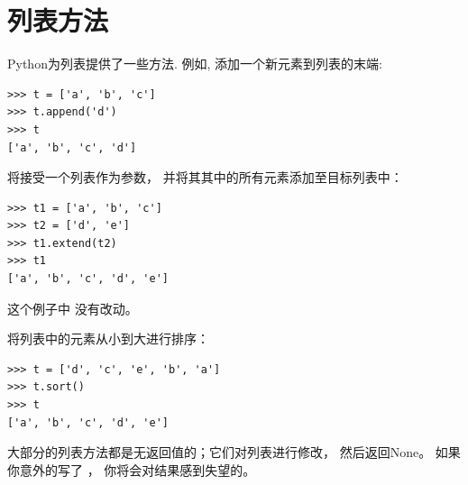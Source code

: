 \section{列表方法}


Python为列表提供了一些方法. 例如,  添加一个新元素到列表的末端:

  

\begin{lstlisting}
>>> t = ['a', 'b', 'c']
>>> t.append('d')
>>> t
['a', 'b', 'c', 'd']
\end{lstlisting}
%

 将接受一个列表作为参数， 并将其其中的所有元素添加至目标列表中：
  

\begin{lstlisting}
>>> t1 = ['a', 'b', 'c']
>>> t2 = ['d', 'e']
>>> t1.extend(t2)
>>> t1
['a', 'b', 'c', 'd', 'e']
\end{lstlisting}

%

这个例子中  没有改动。


 将列表中的元素从小到大进行排序：
  

\begin{lstlisting}
>>> t = ['d', 'c', 'e', 'b', 'a']
>>> t.sort()
>>> t
['a', 'b', 'c', 'd', 'e']
\end{lstlisting}

%

大部分的列表方法都是无返回值的；它们对列表进行修改， 然后返回None。
如果你意外的写了 ， 你将会对结果感到失望的。
  
  


